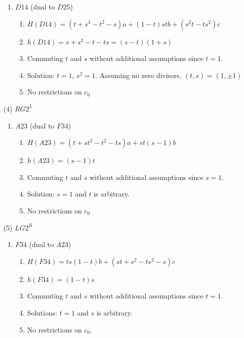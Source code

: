 \documentclass[11pt]{amsart}
\theoremstyle{definition}
\begin{document}
\begin{enumerate}
\begin{enumerate}
            \item \textbf{$D14$} (dual to $D25$)
            \begin{enumerate}
                \item  $H(D14) = (t+s^3-t^2-s)a +(1-t)stb +(s^2t-ts^2)c$
                \item   $h(D14) = s+s^2 -t -ts = (s - t)(1 + s)$
                \item Commuting $t$ and $s$ without additional assumptions since $t=1$.
                \item Solution: $t=1$, $s^2 = 1$. Assuming no zero divisors, $(t,s) = ( 1, \pm 1)$ 
                \item No restrictions on $c_0$
            \end{enumerate}
        \end{enumerate}

        \item[(4)] $RG2^L$
        \begin{enumerate}
            \item \textbf{$A23$} (dual to $F34$)
            \begin{enumerate}
                \item $H(A23)= (t+st^2-t^2-ts)a +st(s-1)b $
                \item  $h(A23) = (s-1)t$
                \item Commuting $t$ and $s$ without additional assumptions since $s=1$.
                \item Solution: $s=1$ and $t$ is arbitrary.
                \item No restrictions on $c_0$
            \end{enumerate}
        \end{enumerate}

 \item[(5)] $LG2^R$
        \begin{enumerate}
            \item \textbf{$F34$} (dual to $A23$)
            \begin{enumerate}
                \item  $H(F34) = ts(1-t)b +(st+s^2-ts^2-s)c $
                \item  $h(F34) = (1-t)s$
                \item Commuting $t$ and $s$ without additional assumptions since $t=1$.
                \item Solutions: $t=1$ and $s$ is arbitrary.               \item No restrictions on $c_0$.
            \end{enumerate}
        \end{enumerate}


\end{enumerate}
\end{document}
